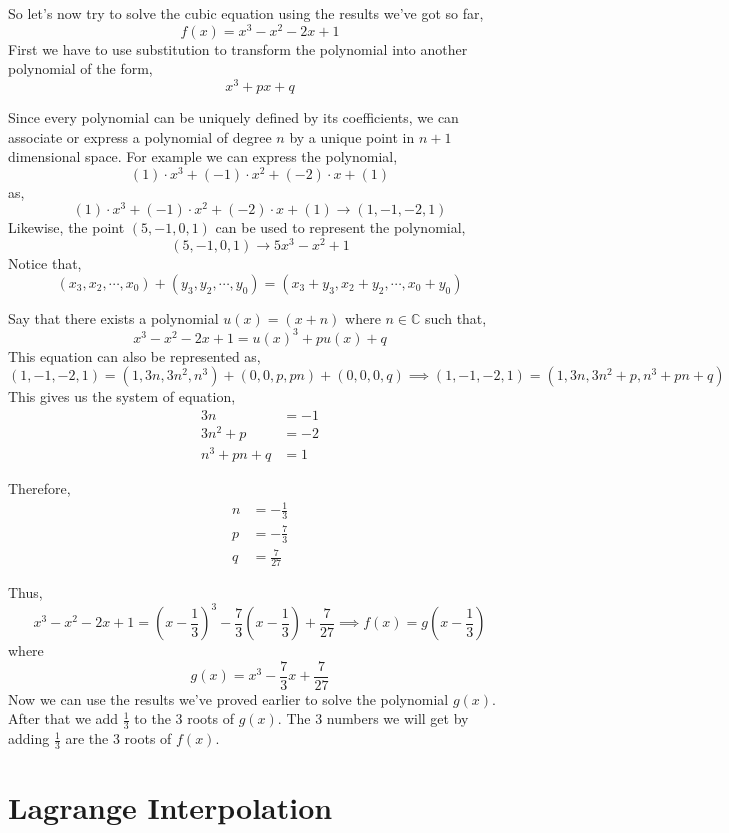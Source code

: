 So let's now try to solve the cubic equation using the results we've got so far,
\[
    f(x) = x^{3} - x^{2} - 2x + 1
\]
First we have to use substitution to transform the polynomial into another polynomial of the form,
\[
    x^{3} + px + q
\]

Since every polynomial can be uniquely defined by its coefficients, we can associate or 
express a polynomial of degree $n$ by a unique point in $n+1$ dimensional space. 
For example we can express the polynomial,
\[
    (1) \cdot x^{3} + (-1) \cdot x^{2} + (-2) \cdot x + (1)
\]
as,
\[
    (1) \cdot x^{3} + (-1) \cdot x^{2} + (-2) \cdot x + (1) \rightarrow (1, -1, -2, 1)
\]
Likewise, the point $(5, -1, 0, 1)$ can be used to represent the polynomial,
\[
    (5, -1, 0, 1) \rightarrow 5x^{3} -x^{2} + 1
\]
Notice that,
\[
    (x_{3}, x_{2}, \cdots, x_{0}) + (y_{3}, y_{2}, \cdots, y_{0}) = (x_{3} + y_{3}, x_{2} + y_{2}, \cdots, x_{0} + y_{0})
\]

Say that there exists a polynomial $u(x) = (x+n)$ where $n \in \mathbb{C}$ such that,
\[
    x^{3} - x^{2} -2x + 1 = u(x)^{3} + pu(x) + q
\]
This equation can also be represented as,
\[
    (1, -1, -2, 1) = (1, 3n, 3n^{2}, n^{3}) + (0, 0, p, pn) + (0,0,0,q) \implies (1, -1, -2, 1) = (1, 3n, 3n^{2}+p, n^{3}+ pn + q)
\]
This gives us the system of equation,
\begin{align*}
   3n              &= -1 \\
   3n^{2} + p      &= -2 \\
    n^{3} + pn + q &= 1
\end{align*}

Therefore,
\begin{align*}
   n &= -\frac{1}{3} \\
   p &= -\frac{7}{3}\\
   q &=  \frac{7}{27}
\end{align*}

Thus,
\[
    x^{3} - x^{2} -2x +1 = \left(x - \frac{1}{3}\right)^{3} -\frac{7}{3}\left(x - \frac{1}{3}\right) +\frac{7}{27} \implies f(x) = g\left(x - \frac{1}{3}\right)
\]
where \[ g(x) = x^{3} - \frac{7}{3}x + \frac{7}{27} \]
Now we can use the results we've proved earlier to solve the polynomial $g(x)$. After that we add $\frac{1}{3}$ to the 3 roots 
of $g(x)$. The 3 numbers we will get by adding $\frac{1}{3}$ are the 3 roots of $f(x)$.

\section{Lagrange Interpolation}

